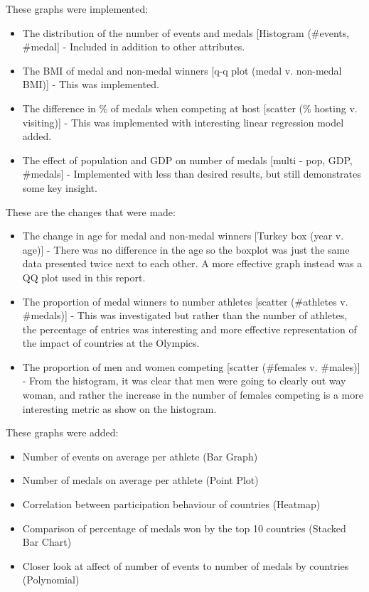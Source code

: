 \documentclass[a4 paper, 12pt]{article}
\begin{document}
            These graphs were implemented:
                \begin{itemize}
                    \item The distribution of the number of events and medals [Histogram (\#events, \#medal] - Included in addition to other attributes.
                    \item The BMI of medal and non-medal winners [q-q plot (medal v. non-medal BMI)] - This was implemented. 
                    \item The difference in \% of medals when competing at host [scatter (\% hosting v. visiting)] - This was implemented with interesting linear regression model added.
                    \item The effect of population and GDP on number of medals [multi - pop, GDP, \#medals] - Implemented with less than desired results, but still demonstrates some key insight.
                \end{itemize}
            These are the changes that were made:
            \begin{itemize}
                \item The change in age for medal and non-medal winners [Turkey box (year v. age)] - There was no difference in the age so the boxplot was just the same data presented twice next to each other. A more effective graph instead was a QQ plot used in this report.
                \item The proportion of medal winners to number athletes [scatter (\#athletes v. \#medals)] - This was investigated but rather than the number of athletes, the percentage of entries was interesting and more effective representation of the impact of countries at the Olympics.
                \item The proportion of men and women competing [scatter (\#females v. \#males)] - From the histogram, it was clear that men were going to clearly out way woman, and rather the increase in the number of females competing is a more interesting metric as show on the histogram.
            \end{itemize}
            These graphs were added:
            \begin{itemize}
                \item Number of events on average per athlete (Bar Graph)
                \item Number of medals on average per athlete (Point Plot)
                \item Correlation between participation behaviour of countries (Heatmap)
                \item Comparison of percentage of medals won by the top 10 countries (Stacked Bar Chart)
                \item Closer look at affect of number of events to number of medals by countries (Polynomial)
            \end{itemize}
\end{document}
